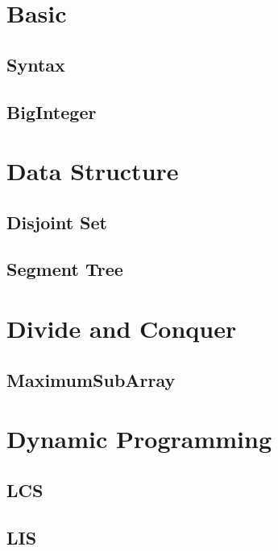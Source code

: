 \section{Basic}

\subsection{Syntax}


\subsection{BigInteger}

\section{Data Structure}

\subsection{Disjoint Set}


\subsection{Segment Tree}

\section{Divide and Conquer}

\subsection{MaximumSubArray}

\section{Dynamic Programming}

\subsection{LCS}


\subsection{LIS}

